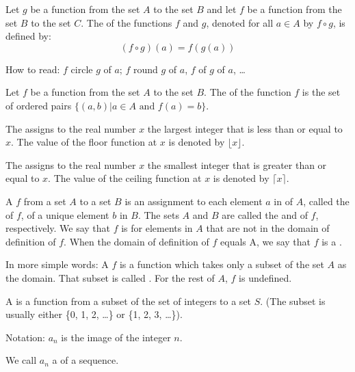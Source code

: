         \par Let $g$ be a function from the set $A$ to the set $B$ and let $f$ be a function from
        the set $B$ to the set $C$. The  of the functions $f$ and $g$, denoted
        for all $a \in A$ by $f \circ g$, is defined by:
        \begin{equation}
            (f \circ g)(a) = f(g(a))
        \end{equation}
        \par How to read: $f$ circle $g$ of $a$; $f$ round $g$ of $a$, $f$ of $g$ of $a$, \ldots

        \par Let $f$ be a function from the set $A$ to the set $B$. The  of the function
        $f$ is the set of ordered pairs $\{(a, b) | a \in A \mbox{ and } f(a) = b\}$.

        \par The  assigns to the real number $x$ the largest integer that
        is less than or equal to $x$. The value of the floor function at $x$ is denoted by
        $\lfloor x \rfloor$.
        \par The  assigns to the real number $x$ the smallest integer that
        is greater than or equal to $x$. The value of the ceiling function at $x$ is denoted by
        $\lceil x \rceil$.
    
        \par A  $f$ from a set $A$ to a set $B$ is an assignment to each
        element $a$ in  of $A$, called the  of $f$,
        of a unique element $b$ in $B$. The sets $A$ and $B$ are called the  and
         of $f$, respectively. We say that $f$ is  for elements
        in $A$ that are not in the domain of definition of $f$. When the domain of definition of
        $f$ equals A, we say that $f$ is a .
        \par In more simple words: A  $f$ is a function which takes only
        a subset of the set $A$ as the domain. That subset is called .
        For the rest of $A$, $f$ is undefined.

        \par A  is a function from a subset of the set of integers to a set $S$.
        (The subset is usually either \{0, 1, 2, \ldots\} or \{1, 2, 3, \ldots\}).
        \par Notation: $a_{n}$ is the image of the integer $n$.
        \par We call $a_{n}$ a  of a sequence.

